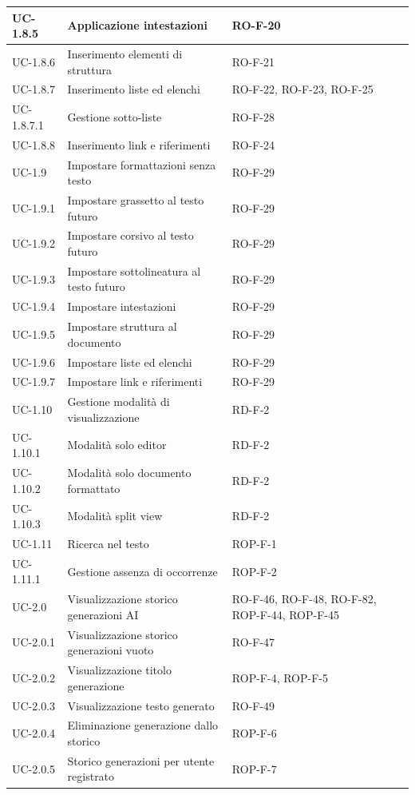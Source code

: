 \documentclass[11pt,a4paper]{article}
\begin{document}
\begin{longtable}{|p{}|p{}|>{\raggedright\arraybackslash}p{}|}
\hline
UC-1.8.5 & Applicazione intestazioni & RO-F-20 \\
\hline
UC-1.8.6 & Inserimento elementi di struttura & RO-F-21 \\
\hline
UC-1.8.7 & Inserimento liste ed elenchi & RO-F-22, RO-F-23, RO-F-25 \\
\hline
UC-1.8.7.1 & Gestione sotto-liste & RO-F-28 \\
\hline
UC-1.8.8 & Inserimento link e riferimenti & RO-F-24 \\
\hline
UC-1.9 & Impostare formattazioni senza testo & RO-F-29 \\
\hline
UC-1.9.1 & Impostare grassetto al testo futuro & RO-F-29 \\
\hline
UC-1.9.2 & Impostare corsivo al testo futuro & RO-F-29 \\
\hline
UC-1.9.3 & Impostare sottolineatura al testo futuro & RO-F-29 \\
\hline
UC-1.9.4 & Impostare intestazioni & RO-F-29 \\
\hline
UC-1.9.5 & Impostare struttura al documento & RO-F-29 \\
\hline
UC-1.9.6 & Impostare liste ed elenchi & RO-F-29 \\
\hline
UC-1.9.7 & Impostare link e riferimenti & RO-F-29 \\
\hline
UC-1.10 & Gestione modalità di visualizzazione & RD-F-2 \\
\hline
UC-1.10.1 & Modalità solo editor & RD-F-2 \\
\hline
UC-1.10.2 & Modalità solo documento formattato & RD-F-2 \\
\hline
UC-1.10.3 & Modalità split view & RD-F-2 \\
\hline
UC-1.11 & Ricerca nel testo & ROP-F-1 \\
\hline
UC-1.11.1 & Gestione assenza di occorrenze & ROP-F-2 \\
\hline
UC-2.0 & Visualizzazione storico generazioni AI & RO-F-46, RO-F-48, RO-F-82, ROP-F-44, ROP-F-45 \\
\hline
UC-2.0.1 & Visualizzazione storico generazioni vuoto & RO-F-47 \\
\hline
UC-2.0.2 & Visualizzazione titolo generazione & ROP-F-4, ROP-F-5 \\
\hline
UC-2.0.3 & Visualizzazione testo generato & RO-F-49 \\
\hline
UC-2.0.4 & Eliminazione generazione dallo storico & ROP-F-6 \\
\hline
UC-2.0.5 & Storico generazioni per utente registrato & ROP-F-7 \\

\end{longtable}
\end{document}
